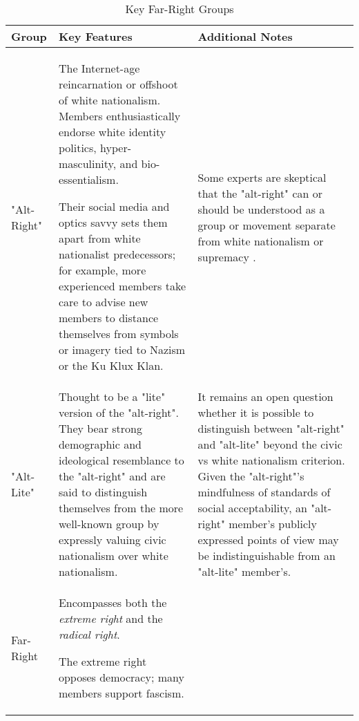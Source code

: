 \documentclass[acmlarge, screen, authorversion]{acmart}
\begin{document}
\begin{table*}
\caption{Key Far-Right Groups}
\label{table:key-terms}
\begin{tabular}{ p{3cm}  p{7cm}  p{6cm} }

  \toprule
  Group & Key Features & Additional Notes \\
  \midrule
  "Alt-Right" & The Internet-age reincarnation or offshoot of white nationalism. Members enthusiastically endorse white identity politics, hyper-masculinity, and bio-essentialism.
  
  \medskip
  
  Their social media and optics savvy sets them apart from white nationalist predecessors; for example, more experienced members take care to advise new members to distance themselves from symbols or imagery tied to Nazism or the Ku Klux Klan.

   & Some experts are skeptical that the "alt-right" can or should be understood as a group or movement separate from white nationalism or supremacy \cite{hartzellAltWhiteConceptualizingAltRight, johndaniszewskiWritingAltright2016}. \\ 
  \hline
  "Alt-Lite" & Thought to be a "lite" version of the "alt-right". They bear strong demographic and ideological resemblance to the "alt-right" and are said to distinguish themselves from the more well-known group by expressly valuing civic nationalism over white nationalism. & It remains an open question whether it is possible to distinguish between "alt-right" and "alt-lite" beyond the civic vs white nationalism criterion. Given the "alt-right"'s mindfulness of standards of social acceptability, an "alt-right" member's publicly expressed points of view may be indistinguishable from an "alt-lite" member's. 
  \\
  \hline
  Far-Right & Encompasses both the \textit{extreme right} and the \textit{radical right}. 
  
  \medskip
  
  The extreme right opposes democracy; many members support fascism. 
  
  \medskip 
  

\end{tabular}
\end{table*}
\end{document}
